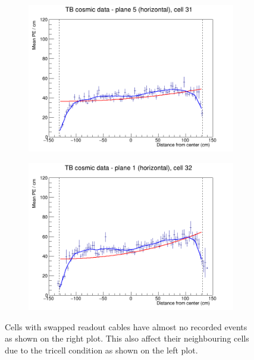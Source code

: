 \documentclass[12pt,a4paper]{article}
\begin{document}
\begin{figure}[h]
  \begin{subfigure}{0.5\textwidth}
    \includegraphics[width=\linewidth]{RelativeCalibrationResults/ep3abc_005_031.png}
  \end{subfigure}
  \begin{subfigure}{0.5\textwidth}
    \includegraphics[width=\linewidth]{RelativeCalibrationResults/ep3abc_001_032.png}
  \end{subfigure}
  \caption{Cells with swapped readout cables have almost no recorded events as shown on the right plot. This also affect their neighbouring cells due to the tricell condition as shown on the left plot.}
  \label{figAttenfitResultsEpoch3abc_UnderfilledCellsNeighbours}
\end{figure}
\end{document}
